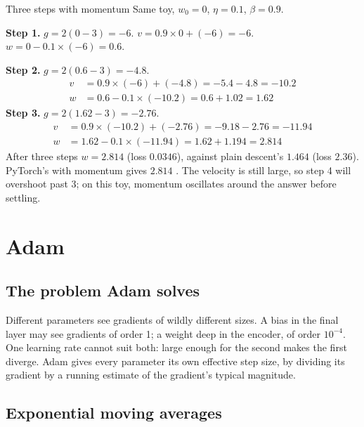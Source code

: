 \begin{worked}[label={we:trainloop:momentum}]{Three steps with momentum}
Same toy, $w_0 = 0$, $\eta = 0.1$, $\beta = 0.9$.

\textbf{Step 1.} $g = 2(0 - 3) = -6$. $v = 0.9 \times 0 + (-6) = -6$. $w = 0 - 0.1 \times (-6) = 0.6$.

\textbf{Step 2.} $g = 2(0.6 - 3) = -4.8$.
\begin{align*}
v &= 0.9 \times (-6) + (-4.8) = -5.4 - 4.8 = -10.2\\
w &= 0.6 - 0.1 \times (-10.2) = 0.6 + 1.02 = 1.62
\end{align*}
\textbf{Step 3.} $g = 2(1.62 - 3) = -2.76$.
\begin{align*}
v &= 0.9 \times (-10.2) + (-2.76) = -9.18 - 2.76 = -11.94\\
w &= 1.62 - 0.1 \times (-11.94) = 1.62 + 1.194 = 2.814
\end{align*}
After three steps $w = 2.814$ (loss $0.0346$), against plain descent's $1.464$ (loss $2.36$).
PyTorch's  with momentum gives $2.814$ \tagC. The velocity is still large, so step 4
will overshoot past 3; on this toy, momentum oscillates around the answer before settling.
\end{worked}

\section{Adam}\label{sec:trainloop:adam}

\subsection{The problem Adam solves}

Different parameters see gradients of wildly different sizes. A bias in the final layer may
see gradients of order 1; a weight deep in the encoder, of order $10^{-4}$. One learning rate
cannot suit both: large enough for the second makes the first diverge. Adam \citep{kingma2015adam}
gives every parameter its own effective step size, by dividing its gradient by a running
estimate of the gradient's typical magnitude.

\subsection{Exponential moving averages}

